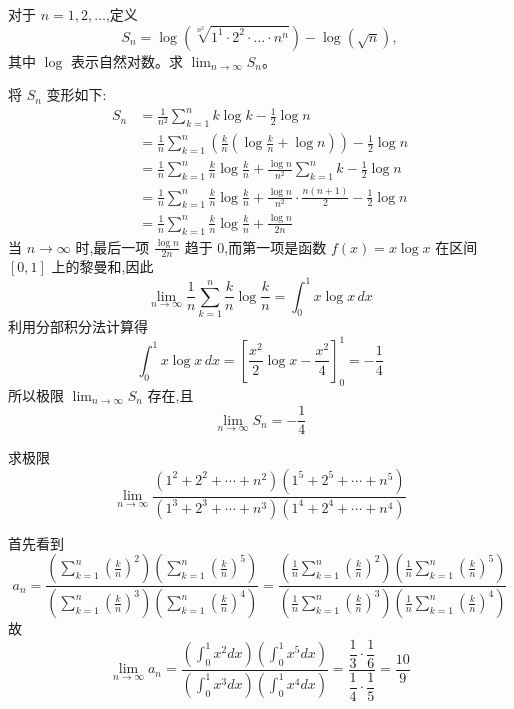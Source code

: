 \begin{questions}
    \question 对于 $n = 1,2,\dots$,定义
    \[
    S_n = \log \left(\sqrt[n^2]{1^1 \cdot 2^2 \cdot \dots \cdot n^n}\right) - \log(\sqrt{n}),
    \]
    其中 $\log$ 表示自然对数。求 $\lim_{n \to \infty} S_n$。
    \begin{solution}
        将 $S_n$ 变形如下:
        \begin{align*}
        S_n &= \frac{1}{n^2} \sum_{k=1}^n k \log k - \frac{1}{2} \log n \\
        &= \frac{1}{n} \sum_{k=1}^n \left( \frac{k}{n} \left(\log \frac{k}{n} + \log n\right) \right) - \frac{1}{2} \log n \\
        &= \frac{1}{n} \sum_{k=1}^n \frac{k}{n} \log \frac{k}{n} + \frac{\log n}{n^2} \sum_{k=1}^n k - \frac{1}{2} \log n \\
        &= \frac{1}{n} \sum_{k=1}^n \frac{k}{n} \log \frac{k}{n} + \frac{\log n}{n^2} \cdot \frac{n(n+1)}{2} - \frac{1}{2} \log n \\
        &= \frac{1}{n} \sum_{k=1}^n \frac{k}{n} \log \frac{k}{n} + \frac{\log n}{2n}
        \end{align*}
        当 $n \to \infty$ 时,最后一项 $\frac{\log n}{2n}$ 趋于 0,而第一项是函数 $f(x) = x \log x$ 在区间 $[0, 1]$ 上的黎曼和,因此
        \[
        \lim_{n \to \infty} \frac{1}{n} \sum_{k=1}^n \frac{k}{n} \log \frac{k}{n} = \int_0^1 x \log x \, dx
        \]
        利用分部积分法计算得
        \[
        \int_0^1 x \log x \, dx = \left[ \frac{x^2}{2} \log x - \frac{x^2}{4} \right]_0^1 = -\frac{1}{4}
        \]
        所以极限 $\lim_{n \to \infty} S_n$ 存在,且
        \[
        \lim_{n \to \infty} S_n = -\frac{1}{4}
        \]
    \end{solution}

    \question 求极限
    \[
    \lim_{n\rightarrow\infty}\frac{(1^{2}+2^{2}+\cdots+n^{2})(1^{5}+2^{5}+\cdots+n^{5})}{(1^{3}+2^{3}+\cdots+n^{3})(1^{4}+2^{4}+\cdots+n^{4})}
    \]
    \begin{solution}
        首先看到
        \[
        a_n=\frac{\displaystyle\left(\sum_{k=1}^{n} \left(\frac{k}{n}\right)^2\right)
        \left(\sum_{k=1}^{n} \left(\frac{k}{n}\right)^5\right)}
        {\displaystyle \left(\sum_{k=1}^{n} \left(\frac{k}{n}\right)^3\right)
        \left(\sum_{k=1}^{n} \left(\frac{k}{n}\right)^4\right)}
        =
        \frac{\displaystyle\left(\frac{1}{n}\sum_{k=1}^{n} \left(\frac{k}{n}\right)^2\right)
        \left(\frac{1}{n}\sum_{k=1}^{n} \left(\frac{k}{n}\right)^5\right)}
        {\displaystyle\left(\frac{1}{n}\sum_{k=1}^{n} \left(\frac{k}{n}\right)^3\right)
        \left(\frac{1}{n}\sum_{k=1}^{n} \left(\frac{k}{n}\right)^4\right)}
        \]
        故
        \[
        \lim_{n\to\infty} a_n
        =\frac{\displaystyle\left(\int_0^1 x^2 dx\right)\left(\int_0^1 x^5 dx\right)}
        {\displaystyle\left(\int_0^1 x^3 dx\right)\left(\int_0^1 x^4 dx\right)}
        =\frac{\dfrac{1}{3}\cdot \dfrac{1}{6}}{\dfrac{1}{4}\cdot \dfrac{1}{5}}
        =\frac{10}{9}
        \]
    \end{solution}


\end{questions}
